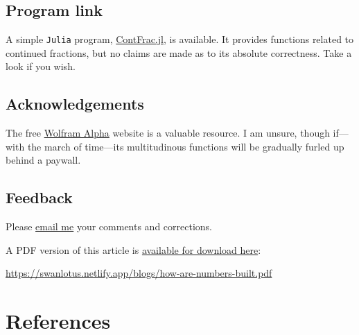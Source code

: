 \documentclass[
  a4paper,
]{article}
\begin{document}
\subsection{Program link}\label{program-link}

A simple \texttt{Julia} program,
\href{auxiliary/ContFrac.jl}{ContFrac.jl}, is available. It provides
functions related to continued fractions, but no claims are made as to
its absolute correctness.  \normalfont Take a look if you
wish.

\subsection{Acknowledgements}\label{acknowledgements}

The free \href{https://www.wolframalpha.com}{Wolfram Alpha} website is a
valuable resource. I am unsure, though if---with the march of time---its
multitudinous functions will be gradually furled up behind a paywall.

\subsection{Feedback}\label{feedback}

Please \href{mailto:feedback.swanlotus@gmail.com}{email me} your
comments and corrections.

\noindent A PDF version of this article is
\href{./how-are-numbers-built.pdf}{available for download here}:

\begin{small}

\begin{sffamily}

\url{https://swanlotus.netlify.app/blogs/how-are-numbers-built.pdf}

\end{sffamily}

\end{small}

\section*{References}\label{bibliography}
\end{document}
